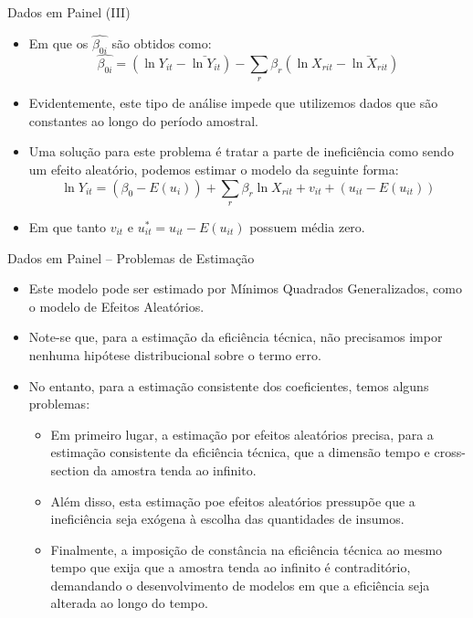 \documentclass{beamer}
\begin{document}
\begin{frame}{Dados em Painel (III)}

\begin{itemize}
\item Em que os $\hat{\beta_{0i}}$ são obtidos como:
\[
\hat{\beta_{0i}}=(\ln Y_{it}-\bar{\ln Y_{it}})-\sum_{r}\beta_{r}(\ln X_{rit}-\bar{\ln X_{rit}})
\]
\item Evidentemente, este tipo de análise impede que utilizemos dados que
são constantes ao longo do período amostral. 
\item Uma solução para este problema é tratar a parte de ineficiência como
sendo um efeito aleatório, podemos estimar o modelo da seguinte forma:
\[
\ln Y_{it}=(\beta_{0}-E(u_{i}))+\sum_{r}\beta_{r}\ln X_{rit}+v_{it}+(u_{it}-E(u_{it}))
\]
\item Em que tanto $v_{it}$ e $u_{it}^{*}=u_{it}-E(u_{it})$ possuem média
zero. 
\end{itemize}
\end{frame}

\begin{frame}{Dados em Painel -- Problemas de Estimação}

\begin{itemize}
\item Este modelo pode ser estimado por Mínimos Quadrados Generalizados,
como o modelo de Efeitos Aleatórios.
\item Note-se que, para a estimação da eficiência técnica, não precisamos
impor nenhuma hipótese distribucional sobre o termo erro. 
\item No entanto, para a estimação consistente dos coeficientes, temos alguns
problemas: 

\begin{itemize}
\item Em primeiro lugar, a estimação por efeitos aleatórios precisa, para
a estimação consistente da eficiência técnica, que a dimensão tempo
e cross-section da amostra tenda ao infinito. 
\item Além disso, esta estimação poe efeitos aleatórios pressupõe que a
ineficiência seja exógena à escolha das quantidades de insumos. 
\item Finalmente, a imposição de constância na eficiência técnica ao mesmo
tempo que exija que a amostra tenda ao infinito é contraditório, demandando
o desenvolvimento de modelos em que a eficiência seja alterada ao
longo do tempo.
\end{itemize}
\end{itemize}
\end{frame}
\end{document}
